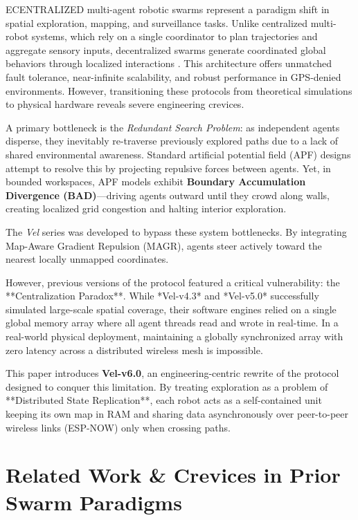 \documentclass[letterpaper, 10pt, conference]{IEEEtran}
\renewcommand{\IEEEPARstart}[2]{\noindent{\fontsize{26pt}{28pt}\selectfont #1}\MakeUppercase{#2}}
\begin{document}
\IEEEPARstart{D}{ecentralized} multi-agent robotic swarms represent a paradigm shift in spatial exploration, mapping, and surveillance tasks. Unlike centralized multi-robot systems, which rely on a single coordinator to plan trajectories and aggregate sensory inputs, decentralized swarms generate coordinated global behaviors through localized interactions \cite{brambilla2013review}. This architecture offers unmatched fault tolerance, near-infinite scalability, and robust performance in GPS-denied environments. However, transitioning these protocols from theoretical simulations to physical hardware reveals severe engineering crevices. 

A primary bottleneck is the \textit{Redundant Search Problem}: as independent agents disperse, they inevitably re-traverse previously explored paths due to a lack of shared environmental awareness. Standard artificial potential field (APF) designs attempt to resolve this by projecting repulsive forces between agents. Yet, in bounded workspaces, APF models exhibit \textbf{Boundary Accumulation Divergence (BAD)}—driving agents outward until they crowd along walls, creating localized grid congestion and halting interior exploration.

The \textit{Vel} series was developed to bypass these system bottlenecks. By integrating Map-Aware Gradient Repulsion (MAGR), agents steer actively toward the nearest locally unmapped coordinates. 

However, previous versions of the protocol featured a critical vulnerability: the **Centralization Paradox**. While *Vel-v4.3* and *Vel-v5.0* successfully simulated large-scale spatial coverage, their software engines relied on a single global memory array where all agent threads read and wrote in real-time. In a real-world physical deployment, maintaining a globally synchronized array with zero latency across a distributed wireless mesh is impossible. 

This paper introduces \textbf{Vel-v6.0}, an engineering-centric rewrite of the protocol designed to conquer this limitation. By treating exploration as a problem of **Distributed State Replication**, each robot acts as a self-contained unit keeping its own map in RAM and sharing data asynchronously over peer-to-peer wireless links (ESP-NOW) only when crossing paths.

\section{Related Work \& Crevices in Prior Swarm Paradigms}
\label{sec:related}
\end{document}
